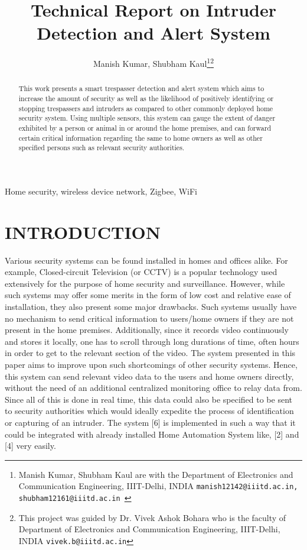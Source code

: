 \documentclass[letterpaper, 10 pt, conference]{ieeeconf}
\title{\LARGE \bf
Technical Report on Intruder Detection and Alert System
}
\author{Manish Kumar, Shubham Kaul\thanks{Manish Kumar, Shubham Kaul are with the Department of Electronics and Communication Engineering, IIIT-Delhi, INDIA
{\tt\small  manish12142@iiitd.ac.in, shubham12161@iiitd.ac.in \newline }}\thanks{This project was guided by Dr. Vivek Ashok Bohara who is the faculty of Department of Electronics and Communication Engineering, IIIT-Delhi, INDIA
        {\tt\small vivek.b@iiitd.ac.in}}}
\begin{document}
\maketitle
\thispagestyle{empty}
\pagestyle{empty}


\begin{abstract}

This work presents a smart trespasser detection and alert system which aims to increase the amount of security as well as the likelihood of positively identifying or stopping trespassers and intruders as compared to other commonly deployed home security system. Using multiple sensors, this system can gauge the extent of danger exhibited by a person or animal in or around the home premises, and can forward certain critical information regarding the same to home owners as well as other specified persons such as relevant security authorities.

\end{abstract}





\begin{keywords}
Home security, wireless device network, Zigbee, WiFi
\end{keywords}
\section{INTRODUCTION}

Various security systems can be found installed in homes and offices alike. For example, Closed-circuit Television (or CCTV) is a popular technology used extensively for the purpose of home security and surveillance. However, while such systems may offer some merits in the form of low cost and relative ease of installation, they also present some major drawbacks. Such systems usually have no mechanism to send critical information to users/home owners if they are not present in the home premises. Additionally, since it records video continuously and stores it locally, one has to scroll through long durations of time, often hours in order to get to the relevant section of the video. 
The system presented in this paper aims to improve upon such shortcomings of other security systems. Hence, this system can send relevant video data to the users and home owners directly, without the need of an additional centralized monitoring office to relay data from. Since all of this is done in real time, this data could also be specified to be sent to security authorities which would ideally expedite the process of identification or capturing of an intruder. The system [6] is implemented in such a way that it could be integrated with already installed Home Automation System like, [2] and [4] very easily.
\end{document}
